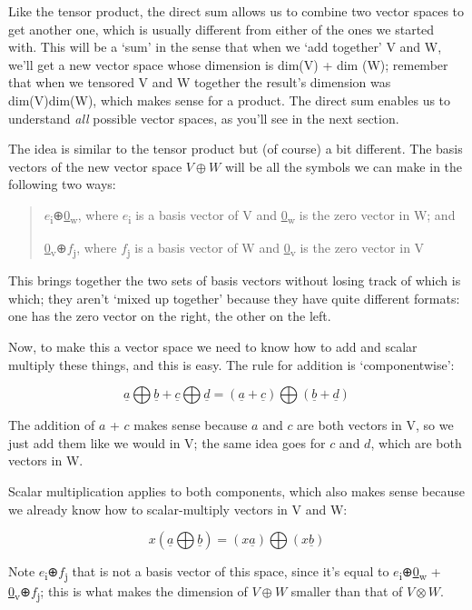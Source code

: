 \documentclass[oneside,english]{amsbook}
\numberwithin{section}{chapter}
\theoremstyle{plain}
\theoremstyle{definition}
\begin{document}
Like the tensor product, the direct sum allows us to combine two vector
spaces to get another one, which is usually different from either of the
ones we started with. This will be a `sum' in the sense that when we
`add together' V and W, we'll get a new vector space whose dimension
is dim(V) + dim (W); remember that when we tensored V and W together the
result's dimension was dim(V)dim(W), which makes sense for a product.
The direct sum enables us to understand \emph{all} possible vector
spaces, as you'll see in the next section.

The idea is similar to the tensor product but (of course) a bit
different. The basis vectors of the new vector space $V\oplus W$ will be all the
symbols we can make in the following two ways:

\begin{quote}
	$e$\textsubscript{i}⊕\ul{0}\textsubscript{w}, where
	$e$\textsubscript{i} is a basis vector of V and
	\ul{0}\textsubscript{w} is the zero vector in W; and
	
	\ul{0}\textsubscript{v}⊕$f$\textsubscript{j}, where
	$f$\textsubscript{j} is a basis vector of W and
	\ul{0}\textsubscript{v} is the zero vector in V
\end{quote}

This brings together the two sets of basis vectors without losing track
of which is which; they aren't `mixed up together' because they have
quite different formats: one has the zero vector on the right, the other
on the left.

Now, to make this a vector space we need to know how to add and scalar
multiply these things, and this is easy. The rule for addition is
`componentwise':

\[\underline{a}\bigoplus\underline{b} + \underline{c}\bigoplus\underline{d} = (\underline{a} + \underline{c})\bigoplus(\underline{b} + \underline{d})\]

The addition of $a$ + $c$ makes sense because $a$ and $c$
are both vectors in V, so we just add them like we would in V; the same
idea goes for $c$ and $d$, which are both vectors in W.

Scalar multiplication applies to both components, which also makes sense
because we already know how to scalar-multiply vectors in V and W:

\[x\left( \underline{a}\bigoplus\underline{b} \right) = (x\underline{a})\bigoplus(x\underline{b})\]

Note $e$\textsubscript{i}⊕$f$\textsubscript{j} that is not a basis
vector of this space, since it's equal to
$e$\textsubscript{i}⊕\ul{0}\textsubscript{w} +
\ul{0}\textsubscript{v}⊕$f$\textsubscript{j}; this is what makes the
dimension of $V\oplus W$ smaller than that of $V\otimes W$.
\end{document}
